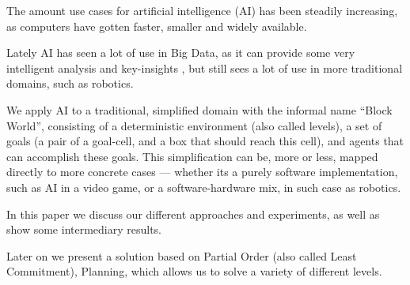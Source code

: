\documentclass[Main]{subfiles}
\begin{document}
The amount use cases for artificial intelligence (AI) has been steadily increasing, as computers have gotten faster, smaller and widely available.\citep{barrons2013}\citep{poynter2014}\citep{sabhnani2011a}

Lately AI has seen a lot of use in Big Data, as it can provide some very intelligent analysis and key-insights \citep{OLeary2013},
but still sees a lot of use in more traditional domains, such as robotics.

We apply AI to a traditional, simplified domain with the informal name ``Block World'', consisting of a deterministic environment (also called levels), a set of goals (a pair of a goal-cell, and a box that should reach this cell), and agents that can accomplish these goals.
This simplification can be, more or less, mapped directly to more concrete cases --- 
whether its a purely software implementation, such as AI in a video game, or a software-hardware mix, in such case as robotics.

In this paper we discuss our different approaches and experiments, as well as show some intermediary results.

Later on we present a solution based on Partial Order (also called Least Commitment), Planning, 
which allows us to solve a variety of different levels. 
\end{document}
